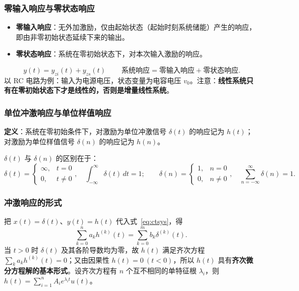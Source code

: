 \subsubsection{零输入响应与零状态响应}
\begin{itemize}
\item \textbf{零输入响应}：无外加激励，仅由起始状态（起始时刻系统储能）产生的响应，即由非零初始状态延续下来的输出。
\item \textbf{零状态响应}：系统在零初始状态下，对本次输入激励的响应。
\end{itemize}
\begin{equation}
\boxed{\ y(t)=y_{zi}(t)+y_{zs}(t)\ }\qquad\text{系统响应}=\text{零输入响应}+\text{零状态响应}.
\end{equation}
以 RC 电路为例：输入为电源电压，状态变量为电容电压 $v_0$。注意：\textbf{线性系统只有在零初始状态下才是线性的，否则是增量线性系统}。

\subsubsection{单位冲激响应与单位样值响应}
\textbf{定义}：系统在零初始条件下，对激励为单位冲激信号 $\delta(t)$ 的响应记为 $h(t)$；对激励为单位样值信号 $\delta(n)$ 的响应记为 $h(n)$。

$\delta(t)$ 与 $\delta(n)$ 的区别在于：
\begin{equation}
\delta(t)=\begin{cases}\infty, & t=0\\ 0, & t\ne 0\end{cases},\quad \int_{-\infty}^{\infty}\delta(t)\,dt=1;
\qquad
\delta(n)=\begin{cases}1, & n=0\\ 0, & n\ne 0\end{cases},\quad \sum_{n=-\infty}^{\infty}\delta(n)=1.
\end{equation}

\subsubsection{冲激响应的形式}
把 $x(t)=\delta(t)$、$y(t)=h(t)$ 代入式~\eqref{eq:ctsys}，得
\begin{equation}
\sum_{k=0}^{n}a_k h^{(k)}(t)=\sum_{k=0}^{m}b_k \delta^{(k)}(t).
\end{equation}
当 $t>0$ 时 $\delta(t)$ 及其各阶导数均为零，故 $h(t)$ 满足齐次方程 $\sum_k a_k h^{(k)}(t)=0$；又由因果性 $h(t)=0\ (t<0)$，所以 $h(t)$ 具有\textbf{齐次微分方程解的基本形式}。设齐次方程有 $n$ 个互不相同的单特征根 $\lambda_i$，则 $h(t)=\sum_{i=1}^{n}A_i e^{\lambda_i t}u(t)$。

